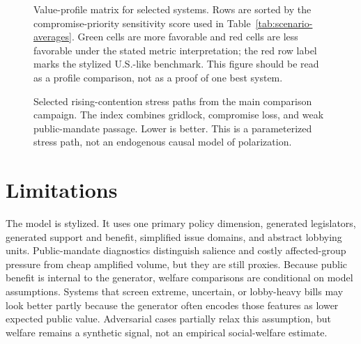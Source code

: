 \documentclass[manuscript,review,anonymous]{acmart}
\begin{document}
\begin{figure}[H]
  \centering
  \resizebox{0.86\linewidth}{!}{}
  \caption{Value-profile matrix for selected systems. Rows are sorted by the compromise-priority sensitivity score used in Table~\ref{tab:scenario-averages}. Green cells are more favorable and red cells are less favorable under the stated metric interpretation; the red row label marks the stylized U.S.-like benchmark. This figure should be read as a profile comparison, not as a proof of one best system.}
  \label{fig:directional-scoreboard}
\end{figure}

\begin{figure}[H]
  \centering
  \resizebox{0.78\linewidth}{!}{}
  \caption{Selected rising-contention stress paths from the main comparison campaign. The index combines gridlock, compromise loss, and weak public-mandate passage. Lower is better. This is a parameterized stress path, not an endogenous causal model of polarization.}
  \label{fig:timeline-contention}
\end{figure}

\section{Limitations}

The model is stylized. It uses one primary policy dimension, generated legislators, generated support and benefit, simplified issue domains, and abstract lobbying units. Public-mandate diagnostics distinguish salience and costly affected-group pressure from cheap amplified volume, but they are still proxies. Because public benefit is internal to the generator, welfare comparisons are conditional on model assumptions. Systems that screen extreme, uncertain, or lobby-heavy bills may look better partly because the generator often encodes those features as lower expected public value. Adversarial cases partially relax this assumption, but welfare remains a synthetic signal, not an empirical social-welfare estimate.
\end{document}
